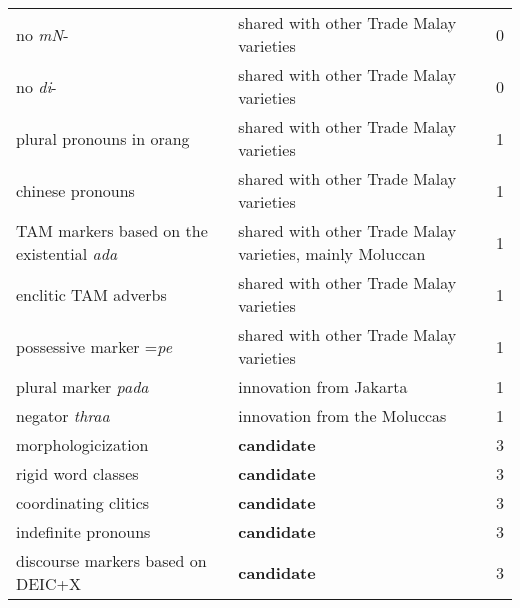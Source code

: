 \begin{table}[h!]
\centering
\begin{tabular}{p{4cm}p{4cm}p{2cm}l}
no \emph{m\E{}N}- & shared with other Trade Malay varieties & \tiny \citet{Adelaar1991,AdelaarEtAl1996,Paauw2004,Paauw2008phd} 	& 0\\ 
no \emph{di}- 	& shared with other Trade Malay varieties  &\tiny \citet{Adelaar1991,AdelaarEtAl1996,Paauw2004,Paauw2008phd} 	& 0\\ 
\hline
plural pronouns in orang& shared with other Trade Malay varieties &  \tiny \citet{Adelaar1991,Paauw2004}	& 1\\ 
chinese pronouns 	& shared with other Trade Malay varieties &\tiny \citet{Adelaar1991,Paauw2004}	& 1\\ 
TAM markers based on the
 existential \em ada\em & shared with other Trade Malay varieties, mainly Moluccan  &\tiny \citet{Adelaar1991}   	& 1\\ 
enclitic TAM adverbs 	& shared with other Trade Malay varieties  &\tiny \citet{Adelaar1991}  	& 1\\ 
possessive marker =\emph{pe} 	& shared with other Trade Malay varieties & \tiny \citet{Adelaar1991,Paauw2004,Paauw2008phd}	& 1\\  
plural marker \emph{pada} 	& innovation from Jakarta  & \tiny \citet{Adelaar1991,Paauw2004} 				& 1 \\ 
negator \emph{thraa} 		& innovation from the Moluccas  &\tiny \citet{Adelaar1991,Paauw2004}			&  1 \\   
\hline
  morphologicization   	& \textbf{candidate} & & 3   \\ 
 rigid word classes  	& \textbf{candidate} & \tiny \citet{Nordhofffcjoat} & 3    \\
 coordinating clitics  	& \textbf{candidate} & \tiny \citet[314-330]{Nordhoff2009}& 3 \\
 indefinite pronouns   	& \textbf{candidate} & \tiny \citet[391-392]{Nordhoff2009}& 3    \\
 discourse markers based on DEIC+X   & \textbf{candidate} &\tiny \citet[359-361]{Nordhoff2009}		&  3 \\

\end{tabular}
\end{table}
